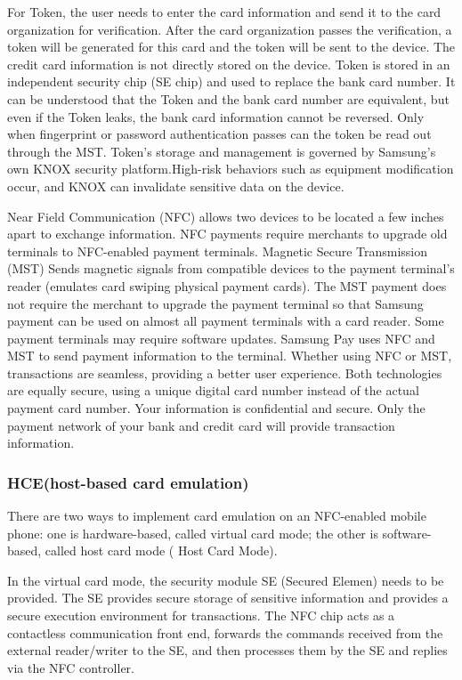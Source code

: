 \documentclass[journal]{IEEEtran}
\begin{document}
For Token, the user needs to enter the card information and send it to the card organization for verification. After the card organization passes the verification, a token will be generated for this card and the token will be sent to the device. The credit card information is not directly stored on the device. Token is stored in an independent security chip (SE chip) and used to replace the bank card number. It can be understood that the Token and the bank card number are equivalent, but even if the Token leaks, the bank card information cannot be reversed. Only when fingerprint or password authentication passes can the token be read out through the MST. Token's storage and management is governed by Samsung's own KNOX security platform.High-risk behaviors such as equipment modification occur, and KNOX can invalidate sensitive data on the device.

Near Field Communication (NFC) allows two devices to be located a few inches apart to exchange information. NFC payments require merchants to upgrade old terminals to NFC-enabled payment terminals. Magnetic Secure Transmission (MST) Sends magnetic signals from compatible devices to the payment terminal's reader (emulates card swiping physical payment cards). The MST payment does not require the merchant to upgrade the payment terminal so that Samsung payment can be used on almost all payment terminals with a card reader. Some payment terminals may require software updates. Samsung Pay uses NFC and MST to send payment information to the terminal. Whether using NFC or MST, transactions are seamless, providing a better user experience. Both technologies are equally secure, using a unique digital card number instead of the actual payment card number. Your information is confidential and secure. Only the payment network of your bank and credit card will provide transaction information.



\subsubsection{HCE(host-based card emulation)}

There are two ways to implement card emulation on an NFC-enabled mobile phone: one is hardware-based, called virtual card mode; the other is software-based, called host card mode ( Host Card Mode).

In the virtual card mode, the security module SE (Secured Elemen) needs to be provided. The SE provides secure storage of sensitive information and provides a secure execution environment for transactions. The NFC chip acts as a contactless communication front end, forwards the commands received from the external reader/writer to the SE, and then processes them by the SE and replies via the NFC controller.
\end{document}
